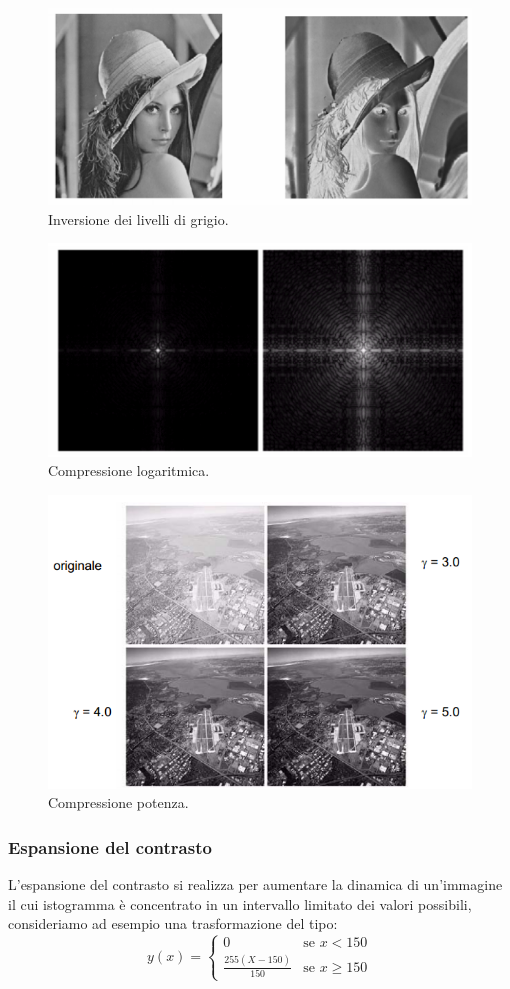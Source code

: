 \begin{figure}[h]
\centering
\includegraphics[width=.5\textwidth]{img/inversione-grigio.png}
\caption{Inversione dei livelli di grigio.}\label{fig:inversione-grigio}
\end{figure}
\begin{figure}[h]
\centering
\includegraphics[width=.5\textwidth]{img/compressione-logaritmica.png}
\caption{Compressione logaritmica.}\label{fig:compressione-logaritmica}
\end{figure}
\begin{figure}[h]
\centering
\includegraphics[width=.5\textwidth]{img/compressione-potenza.png}
\caption{Compressione potenza.}\label{fig:compressione-potenza}
\end{figure}

\subsubsection{Espansione del contrasto}
L'espansione del contrasto si realizza per aumentare la dinamica di 
un’immagine il cui istogramma è concentrato 
in un intervallo limitato dei valori possibili,
consideriamo ad esempio una trasformazione del tipo:
\[
y(x) =
  \begin{cases}
   0       & \text{se } x < 150 \\
   \frac{255  (X-150)}{150}       & \text{se } x \geq 150
  \end{cases}
\]

